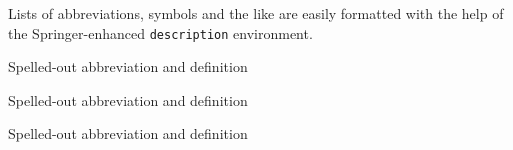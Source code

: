 %
%


Lists of abbreviations, symbols and the like are easily formatted with the help of the Springer-enhanced \verb|description| environment.

\begin{description}[CABR]
\item[ABC]{Spelled-out abbreviation and definition}
\item[BABI]{Spelled-out abbreviation and definition}
\item[CABR]{Spelled-out abbreviation and definition}
\end{description}